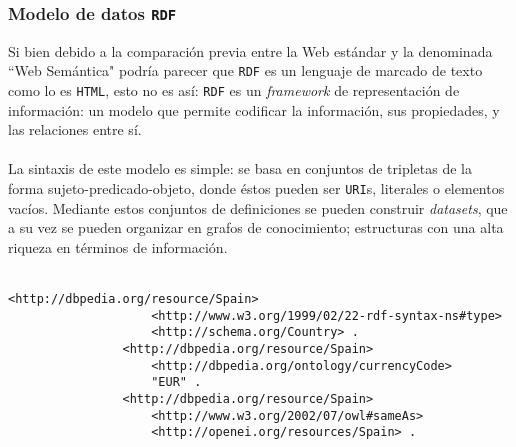         \subsubsection{Modelo de datos \texttt{RDF}} \label{subsubsec:RDF}
            Si bien debido a la comparación previa entre la Web estándar y la denominada ``Web Semántica" podría parecer que \texttt{RDF} es un lenguaje de marcado de texto como lo es \texttt{HTML}, esto no es así: \texttt{RDF} es un \textit{framework} de representación de información: un modelo que permite codificar la información, sus propiedades, y las relaciones entre sí.
            \\ \\
            La sintaxis de este modelo es simple: se basa en conjuntos de tripletas de la forma sujeto-predicado-objeto, donde éstos pueden ser \texttt{URI}s, literales o elementos vacíos. Mediante estos conjuntos de definiciones se pueden construir \textit{datasets}, que a su vez se pueden organizar en grafos de conocimiento; estructuras con una alta riqueza en términos de información.
            \\ \\
            
            \begin{lstlisting}[language=lXML2,gobble=14]
                <http://dbpedia.org/resource/Spain>
                    <http://www.w3.org/1999/02/22-rdf-syntax-ns#type>	
                    <http://schema.org/Country> .
                <http://dbpedia.org/resource/Spain>
                    <http://dbpedia.org/ontology/currencyCode>
                    "EUR" .
                <http://dbpedia.org/resource/Spain>
                    <http://www.w3.org/2002/07/owl#sameAs>
                    <http://openei.org/resources/Spain> .
            \end{lstlisting}
            \label{fig:triplets}
            
            \vspace{0.7cm}
            

